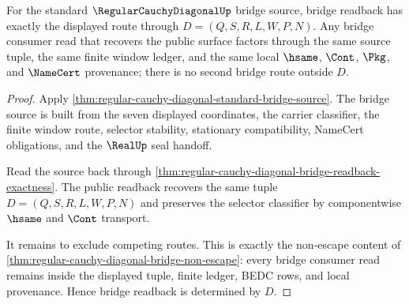 \begin{theorem}
\label{thm:regular-cauchy-diagonal-bridge-route-determinacy}
For the standard $\RegularCauchyDiagonalUp$ bridge source, bridge readback has exactly the displayed route through $D=(Q,S,R,L,W,P,N)$. Any bridge consumer read that recovers the public surface factors through the same source tuple, the same finite window ledger, and the same local $\hsame$, $\Cont$, $\Pkg$, and $\NameCert$ provenance; there is no second bridge route outside $D$.
\end{theorem}
\begin{proof}
Apply \autoref{thm:regular-cauchy-diagonal-standard-bridge-source}. The bridge source is built from the seven displayed coordinates, the carrier classifier, the finite window route, selector stability, stationary compatibility, NameCert obligations, and the $\RealUp$ seal handoff.

Read the source back through \autoref{thm:regular-cauchy-diagonal-bridge-readback-exactness}. The public readback recovers the same tuple $D=(Q,S,R,L,W,P,N)$ and preserves the selector classifier by componentwise $\hsame$ and $\Cont$ transport.

It remains to exclude competing routes. This is exactly the non-escape content of \autoref{thm:regular-cauchy-diagonal-bridge-non-escape}: every bridge consumer read remains inside the displayed tuple, finite ledger, BEDC rows, and local provenance. Hence bridge readback is determined by $D$.
\end{proof}


